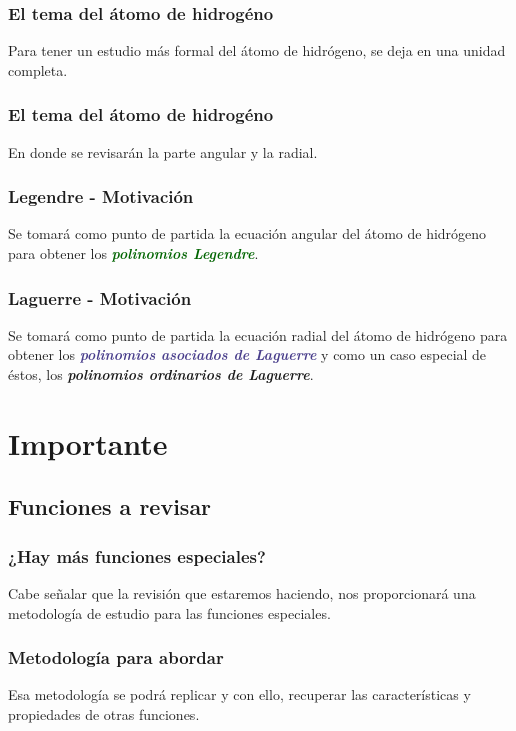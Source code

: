 \documentclass[12pt]{beamer}
\begin{document}
\begin{frame}
\frametitle{El tema del átomo de hidrogéno}
Para tener un estudio más formal del átomo de hidrógeno, se deja en una unidad completa.
\end{frame}
\begin{frame}
\frametitle{El tema del átomo de hidrogéno}
En donde se revisarán la parte angular y la radial.
\end{frame}
\begin{frame}
\frametitle{Legendre - Motivación}
Se tomará como punto de partida la ecuación angular del átomo de hidrógeno para obtener los \emph{\textbf{\textcolor{darkgreen}{polinomios Legendre}}}.
\end{frame}
\begin{frame}
\frametitle{Laguerre - Motivación}
Se tomará como punto de partida la ecuación radial del átomo de hidrógeno para obtener los \emph{\textbf{\textcolor{darkslateblue}{polinomios asociados de Laguerre}}} \pause y como un caso especial de éstos, los \emph{\textbf{\textcolor{darktan}{polinomios ordinarios de Laguerre}}}.
\end{frame}

\section{Importante}
\subsection{Funciones a revisar}

\begin{frame}
\frametitle{¿Hay más funciones especiales?}
Cabe señalar que la revisión que estaremos haciendo, nos proporcionará una metodología de estudio para las funciones especiales.
\end{frame}
\begin{frame}
\frametitle{Metodología para abordar}
Esa metodología se podrá replicar y con ello, recuperar las características y propiedades de otras funciones.
\end{frame}

\end{document}
